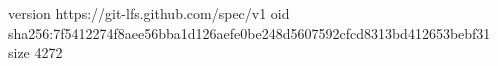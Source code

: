 version https://git-lfs.github.com/spec/v1
oid sha256:7f5412274f8aee56bba1d126aefe0be248d5607592cfcd8313bd412653bebf31
size 4272
